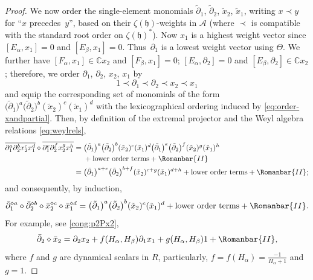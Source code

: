 \documentclass[pdftex]{sigma}
\numberwithin{equation}{section}
\begin{document}
\begin{proof}
	We now order the single-element monomials $\tilde{\partial}_{1}$, $\tilde{\partial}_{2}$, $\tilde{x}_{2}$, $\tilde{x}_{1}$, writing $x \prec y$ for ``$x$ precedes~$y$'', based on their $\zeta(\mathfrak{h})$-weights in $\mathscr{A}$ (where $\prec$ is compatible with the standard root order on $\zeta(\mathfrak{h})^{\ast}$). Now $x_{1}$ is a highest weight vector since $[E_\alpha, x_1] = 0$ and $[E_\beta, x_1]=0$. Thus~$\partial_{1}$ is a lowest weight vector using $\Theta$. We further have
	$[F_\alpha, x_1] \in\mathbb{C} x_2$ and $[F_\beta, x_1]=0$; $[E_{\alpha}, \partial_{2}] = 0$ and $[E_{\beta}, \partial_{2}] \in \mathbb{C} x_{2}$;
	therefore, we order $\partial_{1}$, $\partial_{2}$, $x_{2}$, $x_{1}$ by
	\begin{equation}\label{eq:order-xandpartial}
		1 \prec \partial_1 \prec \partial_2 \prec x_2 \prec x_1
	\end{equation}
	and equip the corresponding set of monomials of the form
	$\bigl(\tilde{\partial}_{1}\bigr)^a\bigl(\tilde{\partial}_{2}\bigr)^b (\tilde{x}_{2})^c(\tilde{x}_{1})^d$
	with the lexicographical ordering induced by \eqref{eq:order-xandpartial}.
	Then, by definition of the extremal projector and the Weyl algebra relations \eqref{eq:weylrels},
	\begin{align*}
		\overline{\partial_1^a \partial_2^b x_2^c x_1^d }\diamond \overline{\partial_1^e \partial_2^f x_2^g x_1^h }={}& \bigl(\tilde{\partial}_{1}\bigr)^a \bigl(\tilde{\partial}_{2}\bigr)^b (\tilde{x}_{2})^c (\tilde{x}_{1})^d \bigl(\tilde{\partial}_{1}\bigr)^e \bigl(\tilde{\partial}_{2}\bigr)^f (\tilde{x}_{2})^g (\tilde{x}_{1})^h \\
& +\text{lower order terms} + \Romanbar{II}\\
={}& \bigl(\tilde{\partial}_{1}\bigr)^{a+e} \bigl(\tilde{\partial}_{2}\bigr)^{b+f} (\tilde{x}_{2})^{c+g} (\tilde{x}_{1})^{d+h} + \text{lower order terms} + \Romanbar{II}; \end{align*}
	and consequently, by induction,
	\[
	\bar \partial_1^{\diamond a} \diamond
	\bar \partial_2^{\diamond b} \diamond
	\bar x_2^{\diamond c} \diamond
	\bar x_1^{\diamond d} = \bigl(\tilde{\partial}_{1}\bigr)^a \bigl(\tilde{\partial}_{2}\bigr)^b (\tilde{x}_{2})^c (\tilde{x}_{1})^d + \text{lower order terms} + \Romanbar{II}.\]
	For example, see \eqref{cong:p2Px2},
	\[\bar \partial_2 \diamond \bar x_2 = \partial_2x_2 + f(H_\alpha,H_\beta) \partial_1 x_1 + g(H_\alpha,H_\beta)1 + \Romanbar{II},\]
	where $f$ and $g$ are dynamical scalars in $R$, particularly, $f = f(H_\alpha) = \frac{-1}{H_{\alpha}+1}$ and $g = 1$.
	

\end{proof}
\end{document}
